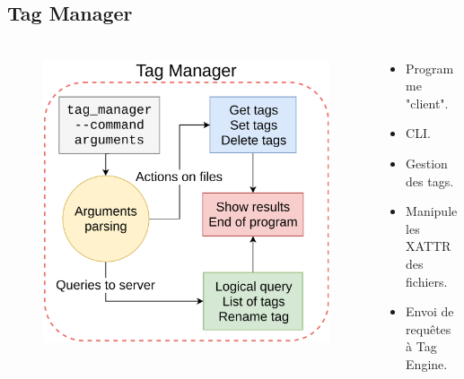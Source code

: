 \documentclass[10pt]{beamer}
\begin{document}
\subsection{Tag Manager}
\begin{frame}
    \frametitle{\subsecname}
    \begin{columns}[T]
        \pause
        \begin{column}{.5\textwidth}
            \begin{figure}
                \begin{center}
                    \includegraphics[width=1\textwidth]{images/tag_manager2.png}
                \end{center}
            \end{figure}
        \end{column}
        \pause
        \begin{column}{.5\textwidth}
            \begin{itemize}
                \item Programme "client".
                \item CLI.
                \item Gestion des tags.
                \item Manipule les XATTR des fichiers.
                \item Envoi de requêtes à Tag Engine.
            \end{itemize}
        \end{column}
    \end{columns}
\end{frame}
\end{document}
